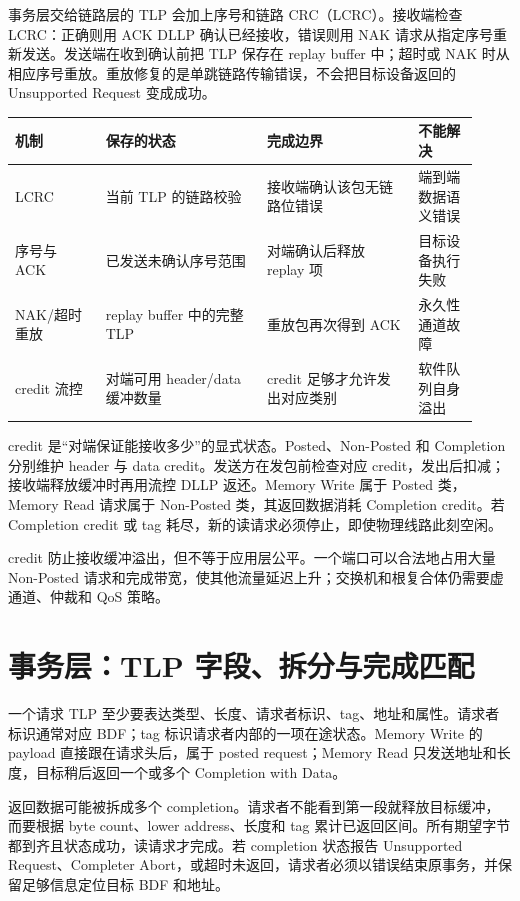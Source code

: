 事务层交给链路层的 TLP 会加上序号和链路 CRC（LCRC）。接收端检查 LCRC：正确则用 ACK DLLP 确认已经接收，错误则用 NAK 请求从指定序号重新发送。发送端在收到确认前把 TLP 保存在 replay buffer 中；超时或 NAK 时从相应序号重放。重放修复的是单跳链路传输错误，不会把目标设备返回的 Unsupported Request 变成成功。

\begin{longtable}{L{0.18\linewidth}L{0.32\linewidth}L{0.30\linewidth}L{0.12\linewidth}}
\toprule
机制 & 保存的状态 & 完成边界 & 不能解决 \\
\midrule
LCRC & 当前 TLP 的链路校验 & 接收端确认该包无链路位错误 & 端到端数据语义错误 \\
序号与 ACK & 已发送未确认序号范围 & 对端确认后释放 replay 项 & 目标设备执行失败 \\
NAK/超时重放 & replay buffer 中的完整 TLP & 重放包再次得到 ACK & 永久性通道故障 \\
credit 流控 & 对端可用 header/data 缓冲数量 & credit 足够才允许发出对应类别 & 软件队列自身溢出 \\
\bottomrule
\end{longtable}

credit 是“对端保证能接收多少”的显式状态。Posted、Non-Posted 和 Completion 分别维护 header 与 data credit。发送方在发包前检查对应 credit，发出后扣减；接收端释放缓冲时再用流控 DLLP 返还。Memory Write 属于 Posted 类，Memory Read 请求属于 Non-Posted 类，其返回数据消耗 Completion credit。若 Completion credit 或 tag 耗尽，新的读请求必须停止，即使物理线路此刻空闲。

credit 防止接收缓冲溢出，但不等于应用层公平。一个端口可以合法地占用大量 Non-Posted 请求和完成带宽，使其他流量延迟上升；交换机和根复合体仍需要虚通道、仲裁和 QoS 策略。

\section{事务层：TLP 字段、拆分与完成匹配}

一个请求 TLP 至少要表达类型、长度、请求者标识、tag、地址和属性。请求者标识通常对应 BDF；tag 标识请求者内部的一项在途状态。Memory Write 的 payload 直接跟在请求头后，属于 posted request；Memory Read 只发送地址和长度，目标稍后返回一个或多个 Completion with Data。

返回数据可能被拆成多个 completion。请求者不能看到第一段就释放目标缓冲，而要根据 byte count、lower address、长度和 tag 累计已返回区间。所有期望字节都到齐且状态成功，读请求才完成。若 completion 状态报告 Unsupported Request、Completer Abort，或超时未返回，请求者必须以错误结束原事务，并保留足够信息定位目标 BDF 和地址。

